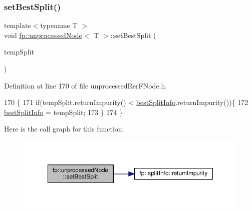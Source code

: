 \subsubsection{\texorpdfstring{set\+Best\+Split()}{setBestSplit()}\hspace{0.1cm}{\footnotesize\ttfamily [1/2]}}
{\footnotesize\ttfamily template$<$typename T $>$ \\
void \hyperlink{classfp_1_1unprocessedNode}{fp\+::unprocessed\+Node}$<$ T $>$\+::set\+Best\+Split (\begin{DoxyParamCaption}\item[{\hyperlink{classfp_1_1splitInfo}{split\+Info}$<$ T $>$}]{temp\+Split }\end{DoxyParamCaption})\hspace{0.3cm}{\ttfamily [inline]}}



Definition at line 170 of file unprocessed\+Rer\+F\+Node.\+h.


\begin{DoxyCode}
170                                                                 \{
171                     \textcolor{keywordflow}{if}(tempSplit.returnImpurity() < \hyperlink{classfp_1_1unprocessedNode_ae60e5f84c9a80537cb84dfd17e70e893}{bestSplitInfo}.returnImpurity())\{
172                         \hyperlink{classfp_1_1unprocessedNode_ae60e5f84c9a80537cb84dfd17e70e893}{bestSplitInfo} = tempSplit;
173                     \}
174                 \}
\end{DoxyCode}
Here is the call graph for this function\+:
\nopagebreak
\begin{figure}[H]
\begin{center}
\leavevmode
\includegraphics[width=350pt]{classfp_1_1unprocessedNode_ae7ad0b6bf8142ea5d3d851e29b5b9aee_cgraph}
\end{center}
\end{figure}
\mbox{\label{classfp_1_1unprocessedNode_ae7ad0b6bf8142ea5d3d851e29b5b9aee}} 
